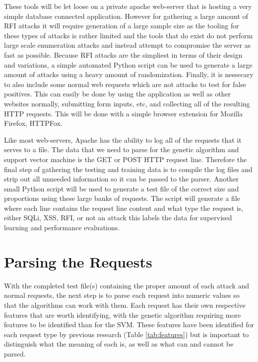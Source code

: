 These tools will be let loose on a private apache web-server that is hosting a very simple database connected application.  However for gathering a large amount of RFI attacks it will require generation of a large sample size as the tooling for these types of attacks is rather limited and the tools that do exist do not perform large scale enumeration attacks and instead attempt to compromise the server as fast as possible. \cite{fimap}  Because RFI attacks are the simpliest in terms of their design and variations, a simple automated Python script can be used to generate a large amount of attacks using a heavy amount of randomization.  Finally, it is nessecary to also include some normal web requests which are not attacks to test for false positives.  This can easily be done by using the application as well as other websites normally, submitting form inputs, etc, and collecting all of the resulting HTTP requests.  This will be done with a simple browser extension for Mozilla Firefox, HTTPFox.

Like most web-servers, Apache has the ability to log all of the requests that it serves to a file.  The data that we need to parse for the genetic algorithm and support vector machine is the GET or POST HTTP request line. Therefore the final step of gathering the testing and training data is to compile the log files and strip out all unneeded information so it can be passed to the parser.  Another small Python script will be used to generate a test file of the correct size and proportions using these large banks of requests.  The script will generate a file where each line contains the request line content and what type the request is, either SQLi, XSS, RFI, or not an attack this labels the data for supervised learning and performance evaluations.

\section{Parsing the Requests} \label{sec:methodsParser}

With the completed test file(s) containing the proper amount of each attack and normal requests, the next step is to parse each request into numeric values so that the algorithms can work with them.  Each request has their own respective features that are worth identifying, with the genetic algorithm requiring more features to be identified than for the SVM.  These features have been identified for each request type by previous research (Table \ref{tab:features}) but is important to distinguish what the meaning of each is, as well as what can and cannot be parsed. \cite{mainPaper}

